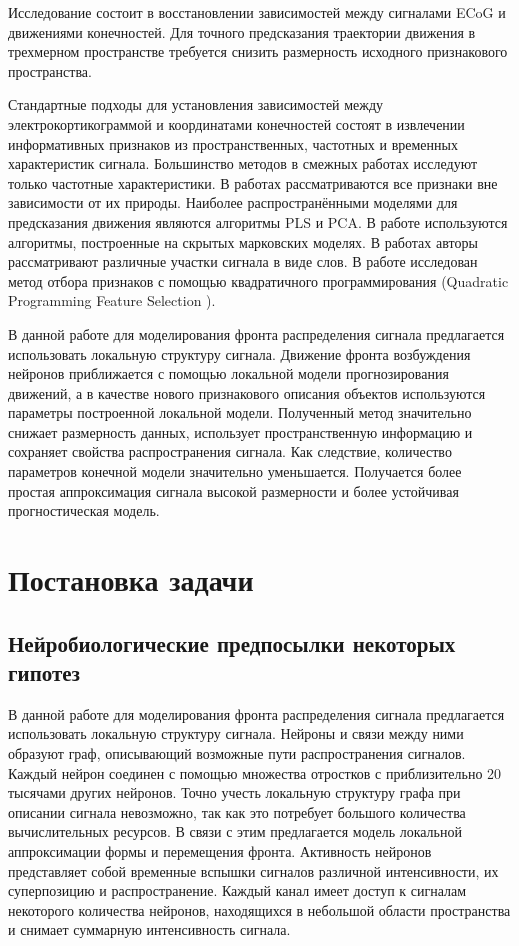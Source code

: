 \documentclass{mipt-thesis-bs}
\begin{document}
Исследование состоит в восстановлении зависимостей между сигналами ECoG и движениями конечностей. Для точного предсказания траектории движения в трехмерном пространстве требуется снизить размерность исходного признакового пространства.

Стандартные подходы для установления зависимостей между электрокортикограммой и координатами конечностей состоят в извлечении информативных признаков из пространственных, частотных и временных характеристик сигнала\cite{Morishita2014,Alexander2013}. Большинство методов в смежных работах исследуют только частотные характеристики\cite{Chin2007,Eliseyev2014,Loza2017}. В работах \cite{Eliseyev2016,Motrenko2018} рассматриваются все признаки вне зависимости от их природы. Наиболее распространёнными моделями для предсказания движения являются алгоритмы PLS\cite{Rosipal2006,Eliseyev2016} и PCA\cite{Zhao2010,Song2017}. В работе \cite{Zhao2014} используются алгоритмы, построенные на скрытых марковских моделях. В  работах \cite{Loza2017,Song2017} авторы рассматривают различные участки сигнала в виде слов. В работе \cite{Motrenko2018} исследован метод отбора признаков с помощью квадратичного программирования (Quadratic Programming Feature Selection \cite{rodriguez2010quadratic}).

В данной работе для моделирования фронта распределения сигнала предлагается использовать локальную структуру сигнала. Движение фронта возбуждения нейронов приближается с помощью локальной модели прогнозирования движений, а в качестве нового признакового описания объектов используются параметры построенной локальной модели. Полученный  метод значительно снижает размерность данных, использует пространственную информацию и сохраняет свойства распространения сигнала.
Как следствие, количество параметров конечной модели значительно уменьшается. Получается более простая аппроксимация сигнала высокой размерности и более устойчивая прогностическая модель.

\chapter{Постановка задачи}
\section{Нейробиологические предпосылки некоторых гипотез}
В данной работе для моделирования фронта распределения сигнала предлагается использовать локальную структуру сигнала. Нейроны и связи между ними образуют граф, описывающий возможные пути распространения сигналов. Каждый нейрон соединен с помощью множества отростков с приблизительно 20 тысячами других нейронов. Точно учесть локальную структуру графа при описании сигнала невозможно, так как это потребует большого количества вычислительных ресурсов. В связи с этим предлагается модель локальной аппроксимации формы и перемещения фронта. Активность нейронов представляет собой временные вспышки сигналов различной интенсивности, их суперпозицию и распространение. Каждый канал имеет доступ к сигналам некоторого количества нейронов, находящихся в небольшой области пространства и снимает суммарную интенсивность сигнала.  
\end{document}
